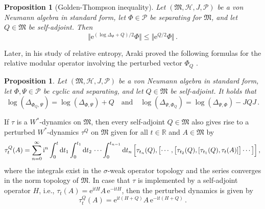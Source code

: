 \documentclass[a4paper, twoside, 11pt, reqno]{amsart}
\theoremstyle{definition}
\theoremstyle{plain}
\newtheorem{proposition}[definition]{Proposition}
\renewcommand{\Delta}{\varDelta}
\renewcommand{\Phi}{\varPhi}
\renewcommand{\Psi}{\varPsi}
\newcommand{\R}{\mathbb{R}}
\newcommand{\MH}{\mathcal{H}}
\newcommand{\MFM}{\mathfrak{M}}
\newcommand{\ii}{\mathrm{i}}
\newcommand{\ee}{\mathrm{e}}
\newcommand{\NPC}{\mathcal{P}}
\newcommand{\1}{\mathbf{1}}
\newcommand{\diff}{\mathop{}\!\mathrm{d}}
\newcommand{\norm}[2][]{#1\Vert{#2}#1\Vert}
\newcommand{\tand}{\quad\text{and}\quad}
\begin{document}
\begin{proposition}[Golden-Thompson inequality]\label{pro:GoldenThompson}
    Let $(\MFM, \MH, J, \NPC)$ be a von Neumann algebra in standard form, let $\Phi \in \NPC$ be separating for $\MFM$, and let $Q \in \MFM$ be self-adjoint. Then
    \begin{equation}\label{eq:GoldenThompson}
        \norm[\big]{\ee^{(\log \Delta_\Phi + Q) / 2} \Phi} \le \norm[\big]{\ee^{Q / 2} \Phi} \, .
    \end{equation}
\end{proposition}

Later, in his study of relative entropy, Araki proved the following formulas for the relative modular operator involving the perturbed vector $\Phi_Q$ \cite[Eqs.~(4.28) and (4.29), p.~189]{Araki1977}.

\begin{proposition}\label{pro:boundedPerturbationRelModOp}
    Let $(\MFM, \MH, J, \NPC)$ be a von Neumann algebra in standard form, let $\Phi, \Psi \in \NPC$ be cyclic and separating, and let $Q \in \MFM$ be self-adjoint. It holds that
    \begin{equation}\label{eq:boundedPerturbationRelModOp}
        \log (\Delta_{\Phi_Q, \Psi}) = \log (\Delta_{\Phi, \Psi}) + Q \tand \log (\Delta_{\Psi, \Phi_Q}) = \log (\Delta_{\Psi, \Phi}) - J Q J \, .
    \end{equation}
\end{proposition}

If $\tau$ is a $W^\ast$-dynamics on $\MFM$, then every self-adjoint $Q \in \MFM$ also gives rise to a perturbed $W^\ast$-dynamics $\tau^Q$ on $\MFM$ given for all $t \in \R$ and $A \in \MFM$ by \cite[Prop. 5.4.1]{BR2}
\begin{equation}\label{eq:boundedPerturbedDynamics}
    \tau_t^Q(A) = \sum_{n=0}^{\infty} \ii^n \int_{0}^{t} \diff t_1 \int_{0}^{t_1} \diff t_2 \, \dotsb \int_{0}^{t_{n-1}} \diff t_n \, \Bigl[\tau_{t_n}(Q), \bigl[\dotsb, \bigl[\tau_{t_2}(Q), [\tau_{t_1}(Q), \tau_t(A)]\bigr] \dotsb\bigr]\Bigr] \, ,
\end{equation}
where the integrals exist in the $\sigma$-weak operator topology and the series converges in the norm topology of $\MFM$. In case that $\tau$ is implemented by a self-adjoint operator $H$, i.e., $\tau_t(A) = \ee^{\ii t H} A \, \ee^{- \ii t H}$, then the perturbed dynamics is given by \cite[Cor. 5.4.2]{BR2}
\begin{equation*}
    \tau_t^Q(A) = \ee^{\ii t (H + Q)} A \, \ee^{- \ii t (H + Q)} \, .
\end{equation*}
\end{document}
